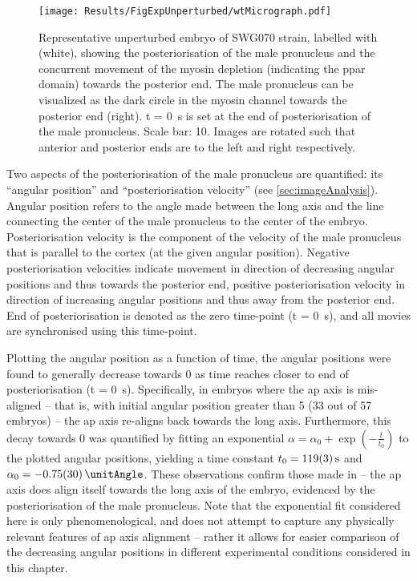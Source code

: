 \begin{figure}
\centering
\texttt{[image: Results/FigExpUnperturbed/wtMicrograph.pdf]}
\caption[Representative micrograph: Unperturbed embryos]{Representative unperturbed embryo of SWG070 strain, labelled with  (white), showing the posteriorisation of the male pronucleus and the concurrent movement of the myosin depletion (indicating the \ac{ppar} domain) towards the posterior end. The male pronucleus can be visualized as the dark circle in the myosin channel towards the posterior end (right). t = \SI{0}{\second} is set at the end of posteriorisation of the male pronucleus. Scale bar: \SI{10}{\unitLength}. Images are rotated such that anterior and posterior ends are to the left and right respectively.}
\label{fig:swg070WtMicrograph}
\end{figure}

Two aspects of the posteriorisation of the male pronucleus are quantified: its \enquote{angular position} and \enquote{posteriorisation velocity} (see \autoref{sec:imageAnalysis}). Angular position refers to the angle made between the long axis and the line connecting the center of the male pronucleus to the center of the embryo. Posteriorisation velocity is the component of the velocity of the male pronucleus that is parallel to the cortex (at the given angular position). Negative posteriorisation velocities indicate movement in direction of decreasing angular positions and thus towards the posterior end, positive posteriorisation velocity in direction of increasing angular positions and thus away from the posterior end. End of posteriorisation is denoted as the zero time-point (t = \SI{0}{\second}), and all movies are synchronised using this time-point. 

Plotting the angular position as a function of time, the angular positions were found to generally decrease towards \SI{0}{\unitAngle} as time reaches closer to end of posteriorisation (t = \SI{0}{\second}). Specifically, in embryos where the \ac{ap} axis is mis-aligned -- that is, with initial angular position greater than \SI{5}{\unitAngle} (\num{33} out of \num{57} embryos) -- the \ac{ap} axis re-aligns back towards the long axis. Furthermore, this decay towards \SI{0}{\unitAngle} was quantified by fitting an exponential $\alpha = \alpha_0 + \exp(-\frac{t}{t_0})$ to the plotted angular positions, yielding a time constant $t_0 = \SI{119 +- 3}{\second}$ and $\alpha_0 = \SI{-0.75 +- 0.3}{\unitAngle}$. These observations confirm those made in \cite{goldstein1996specification} -- the \ac{ap} axis does align itself towards the long axis of the embryo, evidenced by the posteriorisation of the male pronucleus. Note that the exponential fit considered here is only phenomenological, and does not attempt to capture any physically relevant features of \ac{ap} axis alignment -- rather it allows for easier comparison of the decreasing angular positions in different experimental conditions considered in this chapter.

